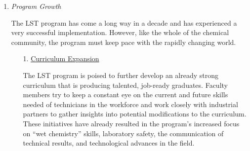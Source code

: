 \documentclass[11.5pt]{sig-alternate} %
\begin{document}
\begin{large}
\begin{enumerate}[label=\Alph*)]
\begin{enumerate}
    \end{enumerate}
    \item \textit{Program Growth}
    \begin{sloppypar}The LST program has come a long way in a decade and has experienced a very successful implementation. However, like the whole of the chemical community, the program must keep pace with the rapidly changing world.\end{sloppypar}
    \begin{enumerate}
        \item[1.] \underline{Curriculum Expansion}
        \begin{sloppypar}The LST program is poised to further develop an already strong curriculum that is producing talented, job-ready graduates. Faculty members try to keep a constant eye on the current and future skills needed of technicians in the workforce and work closely with industrial partners to gather insights into potential modifications to the curriculum. These initiatives have already resulted in the program’s increased focus on “wet chemistry” skills, laboratory safety, the communication of technical results, and technological advances in the field.


\end{sloppypar}
\end{enumerate}
\end{enumerate}
\end{large}
\end{document}
